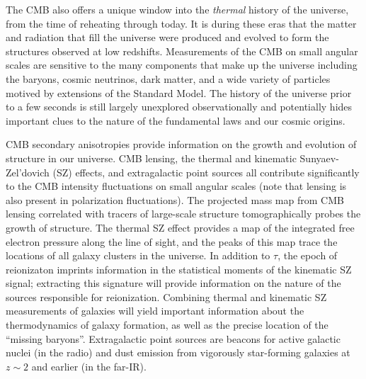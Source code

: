 \documentclass[PICOReport.tex]{subfiles}
\begin{document}
The CMB also offers a unique window into the {\it thermal} history of the universe, from the time of reheating through today.  
It is during these eras that the matter and radiation that fill the universe were produced and evolved to form the structures 
observed at low redshifts.  Measurements of the CMB on small angular scales are sensitive to the many components 
that make up the universe including the baryons, cosmic neutrinos, dark matter, and a wide variety of particles 
motived by extensions of the Standard Model.  The history of the universe prior to a few seconds is still largely 
unexplored observationally and potentially hides important clues to the nature of the fundamental laws and our cosmic origins.

CMB secondary anisotropies provide information on the growth and evolution of structure in our universe. 
CMB lensing, the thermal and kinematic Sunyaev-Zel'dovich (SZ) effects, and extragalactic point sources all 
contribute significantly to the CMB intensity fluctuations on small angular scales (note that lensing is also 
present in polarization fluctuations). The projected mass map from CMB lensing correlated with tracers of 
large-scale structure tomographically probes the growth of structure. The thermal SZ effect provides a map of 
the integrated free electron pressure along the line of sight, and the peaks of this map trace the locations of 
all galaxy clusters in the universe. In addition to $\tau$, the epoch of reionizaton imprints information in the 
statistical moments of the kinematic SZ signal; extracting this signature will provide information on the nature 
of the sources responsible for reionization.  Combining thermal and kinematic SZ measurements of galaxies 
will yield important information about the thermodynamics of galaxy formation, as well as the precise location 
of the ``missing baryons''. Extragalactic point sources are beacons for active galactic nuclei (in the radio) and 
dust emission from vigorously star-forming galaxies at $z \sim 2$ and earlier (in the far-IR).


\end{document}
